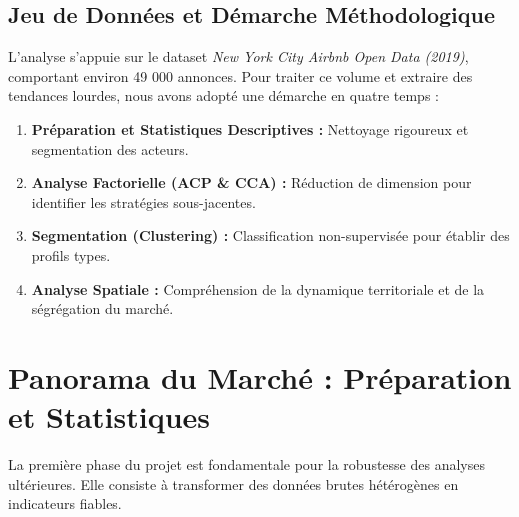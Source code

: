 \documentclass[a4paper, 12pt]{article}
\begin{document}
\subsection{Jeu de Données et Démarche Méthodologique}
L'analyse s'appuie sur le dataset \textit{New York City Airbnb Open Data (2019)}, comportant environ 49 000 annonces. Pour traiter ce volume et extraire des tendances lourdes, nous avons adopté une démarche en quatre temps :
\begin{enumerate}
    \item \textbf{Préparation et Statistiques Descriptives :} Nettoyage rigoureux et segmentation des acteurs.
    \item \textbf{Analyse Factorielle (ACP & CCA) :} Réduction de dimension pour identifier les stratégies sous-jacentes.
    \item \textbf{Segmentation (Clustering) :} Classification non-supervisée pour établir des profils types.
    \item \textbf{Analyse Spatiale :} Compréhension de la dynamique territoriale et de la ségrégation du marché.
\end{enumerate}

\section{Panorama du Marché : Préparation et Statistiques}

La première phase du projet est fondamentale pour la robustesse des analyses ultérieures. Elle consiste à transformer des données brutes hétérogènes en indicateurs fiables.
\end{document}

